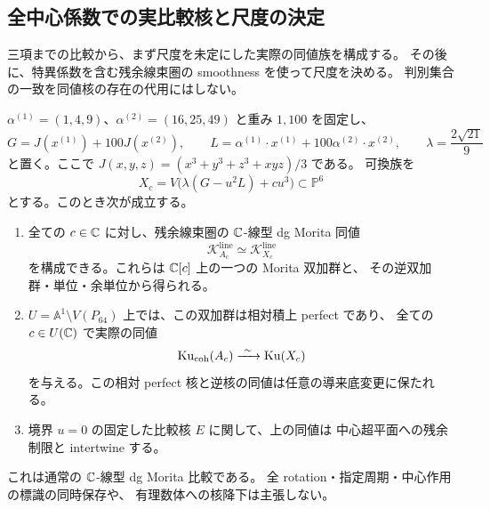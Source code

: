 \subsection{全中心係数での実比較核と尺度の決定}
\label{cmo:subsec:all-central-kernel}

三項までの比較から、まず尺度を未定にした実際の同値族を構成する。
その後に、特異係数を含む残余線束圏の smoothness を使って尺度を決める。
判別集合の一致を同値核の存在の代用にはしない。

\begin{theorem}
\label{cmo:thm:all-central-commutative-kernel}
$\alpha^{(1)}=(1,4,9)$、$\alpha^{(2)}=(16,25,49)$ と重み $1,100$ を固定し、
\[
 G=J(x^{(1)})+100J(x^{(2)}),\qquad
 L=\alpha^{(1)}\cdot x^{(1)}+100\alpha^{(2)}\cdot x^{(2)},\qquad
 \lambda=\frac{2\sqrt{21}}9
\]
と置く。ここで $J(x,y,z)=(x^3+y^3+z^3+xyz)/3$ である。
可換族を
\begin{equation}\label{cmo:eq:all-central-target}
 X_c=V\bigl(\lambda(G-u^2L)+cu^3\bigr)\subset\mathbb P^6
\end{equation}
とする。このとき次が成立する。
\begin{enumerate}
 \item 全ての $c\in\mathbb C$ に対し、残余線束圏の $\mathbb C$-線型 dg Morita 同値
 \[
 \mathcal K^{\mathrm{line}}_{A_c}\simeq
 \mathcal K^{\mathrm{line}}_{X_c}
 \]
 を構成できる。これらは $\mathbb C[c]$ 上の一つの Morita 双加群と、
 その逆双加群・単位・余単位から得られる。
 \item $U=\mathbb A^1\setminus V(P_{64})$ 上では、この双加群は相対積上 perfect であり、
 全ての $c\in U(\mathbb C)$ で実際の同値
 \begin{equation}\label{cmo:eq:all-central-coherent-equivalence}
 \operatorname{Ku}_{\mathrm{coh}}(A_c)\xrightarrow{\ \sim\ }\operatorname{Ku}(X_c)
 \end{equation}
 を与える。この相対 perfect 核と逆核の同値は任意の導来底変更に保たれる。
 \item 境界 $u=0$ の固定した比較核 $E$ に関して、上の同値は
 中心超平面への残余制限と intertwine する。
\end{enumerate}
これは通常の $\mathbb C$-線型 dg Morita 比較である。
全 rotation・指定周期・中心作用の標識の同時保存や、
有理数体への核降下は主張しない。
\end{theorem}

